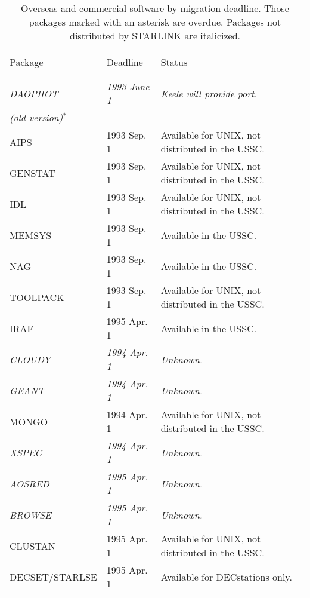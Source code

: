 \begin{table}
\begin{center}
\caption{Overseas and commercial software by migration deadline.
Those packages marked with an asterisk are overdue.
Packages not distributed by STARLINK are italicized.}
\vspace{5mm}
\begin{tabular}{|p{36mm}|p{30mm}|p{60mm}|} \hline \label{t_OCdead}
& & \\
Package & Deadline & Status \\
& & \\ \hline
& & \\
{\em DAOPHOT}         & {\em 1993 June 1} & {\em Keele will provide port.} \\
{\em (old version)}$^{\ast}$ &             & \\
AIPS                  & 1993 Sep. 1 & Available for UNIX, not distributed in 
   the USSC. \\
GENSTAT               & 1993 Sep. 1 & Available for UNIX, not distributed in 
   the USSC. \\
IDL                   & 1993 Sep. 1 & Available for UNIX, not distributed in 
   the USSC. \\
MEMSYS                & 1993 Sep. 1 & Available in the USSC. \\
NAG                   & 1993 Sep. 1 & Available in the USSC. \\
TOOLPACK              & 1993 Sep. 1 & Available for UNIX, not distributed in 
   the USSC. \\
IRAF                  & 1995 Apr. 1 & Available in the USSC. \\
{\em CLOUDY}          & {\em 1994 Apr. 1} & {\em Unknown.} \\
{\em GEANT}           & {\em 1994 Apr. 1} & {\em Unknown.} \\
MONGO                 & 1994 Apr. 1 & Available for UNIX, not distributed in 
   the USSC. \\
{\em XSPEC}           & {\em 1994 Apr. 1} & {\em Unknown.} \\
{\em AOSRED}          & {\em 1995 Apr. 1} & {\em Unknown.} \\
{\em BROWSE}          & {\em 1995 Apr. 1} & {\em Unknown.} \\
CLUSTAN               & 1995 Apr. 1 & Available for UNIX, not distributed in 
   the USSC. \\
DECSET/STARLSE        & 1995 Apr. 1 & Available for DECstations only. \\

\end{tabular}
\end{center}
\end{table}
